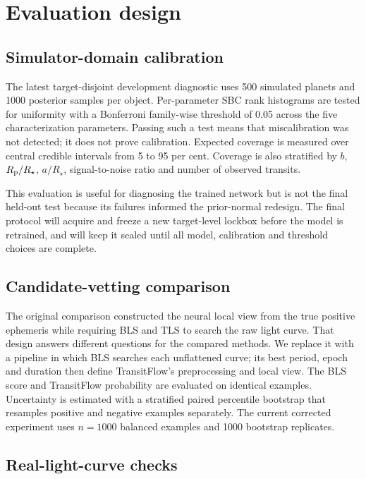 \documentclass[fleqn,usenatbib]{mnras}
\begin{document}
\section{Evaluation design}
\label{sec:evaluation}

\subsection{Simulator-domain calibration}

The latest target-disjoint development diagnostic uses 500 simulated planets
and 1000 posterior samples per object. Per-parameter SBC rank histograms are
tested for uniformity with a
Bonferroni family-wise threshold of 0.05 across the five characterization
parameters. Passing such a test means that miscalibration was not detected; it
does not prove calibration. Expected coverage is measured over central credible
intervals from 5 to 95 per cent. Coverage is also stratified by $b$,
$R_{\rm p}/R_\star$, $a/R_\star$, signal-to-noise ratio and number of observed
transits.

This evaluation is useful for diagnosing the trained network but is not the
final held-out test because its failures informed the prior-normal redesign.
The final protocol will acquire and freeze a new target-level lockbox before
the model is retrained, and will keep it sealed until all model, calibration and
threshold choices are complete.

\subsection{Candidate-vetting comparison}

The original comparison constructed the neural local view from the true
positive ephemeris while requiring BLS and TLS to search the raw light curve.
That design answers different questions for the compared methods. We replace it
with a pipeline in which BLS searches each unflattened curve; its best period,
epoch and duration then define TransitFlow's preprocessing and local view. The
BLS score and TransitFlow probability are evaluated on identical examples.
Uncertainty is estimated with a stratified paired percentile bootstrap that
resamples positive and negative examples separately. The current corrected
experiment uses $n=1000$ balanced examples and 1000 bootstrap replicates.

\subsection{Real-light-curve checks}
\end{document}
